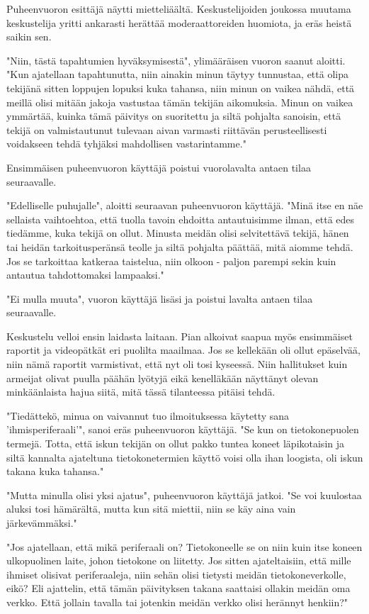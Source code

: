 Puheenvuoron esittäjä näytti mietteliäältä. Keskustelijoiden joukossa muutama keskustelija yritti ankarasti herättää moderaattoreiden huomiota, ja eräs heistä saikin sen.


"Niin, tästä tapahtumien hyväksymisestä", ylimääräisen vuoron saanut aloitti. "Kun ajatellaan tapahtunutta, niin ainakin minun täytyy tunnustaa, että olipa tekijänä sitten loppujen lopuksi kuka tahansa, niin minun on vaikea nähdä, että meillä olisi mitään jakoja vastustaa tämän tekijän aikomuksia. Minun on vaikea ymmärtää, kuinka tämä päivitys on suoritettu ja siltä pohjalta sanoisin, että tekijä on valmistautunut tulevaan aivan varmasti riittävän perusteellisesti voidakseen tehdä tyhjäksi mahdollisen vastarintamme."


Ensimmäisen puheenvuoron käyttäjä poistui vuorolavalta antaen tilaa seuraavalle.


"Edelliselle puhujalle", aloitti seuraavan puheenvuoron käyttäjä. "Minä itse en näe sellaista vaihtoehtoa, että tuolla tavoin ehdoitta antautuisimme ilman, että edes tiedämme, kuka tekijä on ollut. Minusta meidän olisi selvitettävä tekijä, hänen tai heidän tarkoitusperänsä teolle ja siltä pohjalta päättää, mitä aiomme tehdä. Jos se tarkoittaa katkeraa taistelua, niin olkoon - paljon parempi sekin kuin antautua tahdottomaksi lampaaksi."


"Ei mulla muuta", vuoron käyttäjä lisäsi ja poistui lavalta antaen tilaa seuraavalle.




\psep Keskustelu velloi ensin laidasta laitaan. Pian alkoivat saapua myös ensimmäiset raportit ja videopätkät eri puolilta maailmaa. Jos se kellekään oli ollut epäselvää, niin nämä raportit varmistivat, että nyt oli tosi kyseessä. Niin hallitukset kuin armeijat olivat puulla päähän lyötyjä eikä kenelläkään näyttänyt olevan minkäänlaista hajua siitä, mitä tässä tilanteessa pitäisi tehdä.


"Tiedättekö, minua on vaivannut tuo ilmoituksessa käytetty sana 'ihmisperiferaali'", sanoi eräs puheenvuoron käyttäjä. "Se kun on tietokonepuolen termejä. Totta, että iskun tekijän on ollut pakko tuntea koneet läpikotaisin ja siltä kannalta ajateltuna tietokonetermien käyttö voisi olla ihan loogista, oli iskun takana kuka tahansa."


"Mutta minulla olisi yksi ajatus", puheenvuoron käyttäjä jatkoi. "Se voi kuulostaa aluksi tosi hämärältä, mutta kun sitä miettii, niin se käy aina vain järkevämmäksi."


"Jos ajatellaan, että mikä periferaali on? Tietokoneelle se on niin kuin itse koneen ulkopuolinen laite, johon tietokone on liitetty. Jos sitten ajateltaisiin, että mille ihmiset olisivat periferaaleja, niin sehän olisi tietysti meidän tietokoneverkolle, eikö? Eli ajattelin, että tämän päivityksen takana saattaisi ollakin meidän oma verkko. Että jollain tavalla tai jotenkin meidän verkko olisi herännyt henkiin?"




